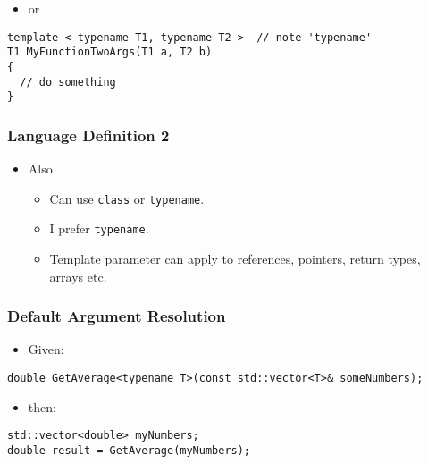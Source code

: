\begin{itemize}
\tightlist
\item
  or
\end{itemize}

\begin{verbatim}
template < typename T1, typename T2 >  // note 'typename'
T1 MyFunctionTwoArgs(T1 a, T2 b)
{
  // do something
}
\end{verbatim}

\hypertarget{language-definition-2}{%
\subsubsection{Language Definition 2}\label{language-definition-2}}

\begin{itemize}
\tightlist
\item
  Also

  \begin{itemize}
  \tightlist
  \item
    Can use \texttt{class} or \texttt{typename}.
  \item
    I prefer \texttt{typename}.
  \item
    Template parameter can apply to references, pointers, return types,
    arrays etc.
  \end{itemize}
\end{itemize}

\hypertarget{default-argument-resolution}{%
\subsubsection{Default Argument
Resolution}\label{default-argument-resolution}}

\begin{itemize}
\tightlist
\item
  Given:
\end{itemize}

\begin{verbatim}
double GetAverage<typename T>(const std::vector<T>& someNumbers);
\end{verbatim}

\begin{itemize}
\tightlist
\item
  then:
\end{itemize}

\begin{verbatim}
std::vector<double> myNumbers;
double result = GetAverage(myNumbers);
\end{verbatim}

